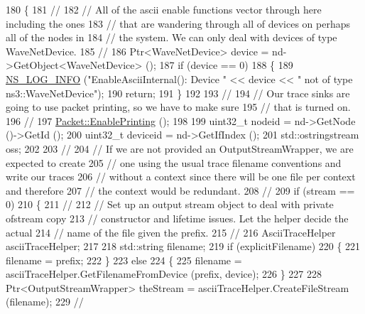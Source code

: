 \begin{DoxyCode}
180 \{
181   \textcolor{comment}{//}
182   \textcolor{comment}{// All of the ascii enable functions vector through here including the ones}
183   \textcolor{comment}{// that are wandering through all of devices on perhaps all of the nodes in}
184   \textcolor{comment}{// the system.  We can only deal with devices of type WaveNetDevice.}
185   \textcolor{comment}{//}
186   Ptr<WaveNetDevice> device = nd->GetObject<WaveNetDevice> ();
187   \textcolor{keywordflow}{if} (device == 0)
188     \{
189       \hyperlink{group__logging_gafbd73ee2cf9f26b319f49086d8e860fb}{NS\_LOG\_INFO} (\textcolor{stringliteral}{"EnableAsciiInternal(): Device "} << device << \textcolor{stringliteral}{" not of type
       ns3::WaveNetDevice"});
190       \textcolor{keywordflow}{return};
191     \}
192 
193   \textcolor{comment}{//}
194   \textcolor{comment}{// Our trace sinks are going to use packet printing, so we have to make sure}
195   \textcolor{comment}{// that is turned on.}
196   \textcolor{comment}{//}
197   \hyperlink{classns3_1_1Packet_ae17c0cd8e63e83df3c9273801e3d5d7f}{Packet::EnablePrinting} ();
198 
199   uint32\_t nodeid = nd->GetNode ()->GetId ();
200   uint32\_t deviceid = nd->GetIfIndex ();
201   std::ostringstream oss;
202 
203   \textcolor{comment}{//}
204   \textcolor{comment}{// If we are not provided an OutputStreamWrapper, we are expected to create}
205   \textcolor{comment}{// one using the usual trace filename conventions and write our traces}
206   \textcolor{comment}{// without a context since there will be one file per context and therefore}
207   \textcolor{comment}{// the context would be redundant.}
208   \textcolor{comment}{//}
209   \textcolor{keywordflow}{if} (stream == 0)
210     \{
211       \textcolor{comment}{//}
212       \textcolor{comment}{// Set up an output stream object to deal with private ofstream copy}
213       \textcolor{comment}{// constructor and lifetime issues.  Let the helper decide the actual}
214       \textcolor{comment}{// name of the file given the prefix.}
215       \textcolor{comment}{//}
216       AsciiTraceHelper asciiTraceHelper;
217 
218       std::string filename;
219       \textcolor{keywordflow}{if} (explicitFilename)
220         \{
221           filename = prefix;
222         \}
223       \textcolor{keywordflow}{else}
224         \{
225           filename = asciiTraceHelper.GetFilenameFromDevice (prefix, device);
226         \}
227 
228       Ptr<OutputStreamWrapper> theStream = asciiTraceHelper.CreateFileStream (filename);
229       \textcolor{comment}{//}

\end{DoxyCode}
